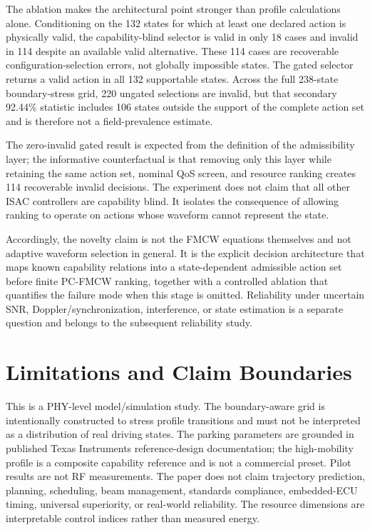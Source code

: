 \documentclass[conference,a4paper]{IEEEtran}
\begin{document}
The ablation makes the architectural point stronger than profile calculations alone. Conditioning on the 132 states for which at least one declared action is physically valid, the capability-blind selector is valid in only 18 cases and invalid in 114 despite an available valid alternative. These 114 cases are recoverable configuration-selection errors, not globally impossible states. The gated selector returns a valid action in all 132 supportable states. Across the full 238-state boundary-stress grid, 220 ungated selections are invalid, but that secondary 92.44\% statistic includes 106 states outside the support of the complete action set and is therefore not a field-prevalence estimate.

The zero-invalid gated result is expected from the definition of the admissibility layer; the informative counterfactual is that removing only this layer while retaining the same action set, nominal QoS screen, and resource ranking creates 114 recoverable invalid decisions. The experiment does not claim that all other ISAC controllers are capability blind. It isolates the consequence of allowing ranking to operate on actions whose waveform cannot represent the state.

Accordingly, the novelty claim is not the FMCW equations themselves and not adaptive waveform selection in general. It is the explicit decision architecture that maps known capability relations into a state-dependent admissible action set before finite PC-FMCW ranking, together with a controlled ablation that quantifies the failure mode when this stage is omitted. Reliability under uncertain SNR, Doppler/synchronization, interference, or state estimation is a separate question and belongs to the subsequent reliability study.

\section{Limitations and Claim Boundaries}
This is a PHY-level model/simulation study. The boundary-aware grid is intentionally constructed to stress profile transitions and must not be interpreted as a distribution of real driving states. The parking parameters are grounded in published Texas Instruments reference-design documentation; the high-mobility profile is a composite capability reference and is not a commercial preset. Pilot results are not RF measurements. The paper does not claim trajectory prediction, planning, scheduling, beam management, standards compliance, embedded-ECU timing, universal superiority, or real-world reliability. The resource dimensions are interpretable control indices rather than measured energy.
\end{document}
